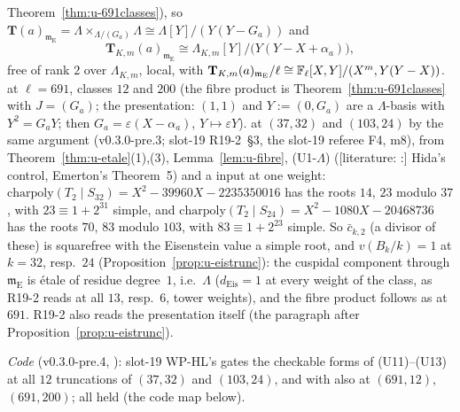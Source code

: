 \documentclass[11pt]{article}
\newcommand{\LIT}[1]{\textsf{[literature: #1]}}   %
\newcommand{\Iw}{\Lambda}                         %
\newcommand{\Tu}{\mathbf{T}}                      %
\newcommand{\Eis}{\mathrm{E}}
\begin{document}
\begin{prediction}
\begin{enumerate}
  Theorem~\ref{thm:u-691classes}), so $\Tu(a)_{\mathfrak m_\Eis}=\Iw\times_{\Iw/(G_a)}\Iw\cong\Iw[Y]/(Y(Y-G_a))$ and
  \[
    \Tu_{K,m}(a)_{\mathfrak m_\Eis}\cong\Iw_{K,m}[Y]/\bigl(Y(Y-X+\alpha_a)\bigr),
  \]
  free of rank $2$ over $\Iw_{K,m}$, local, with $\Tu_{K,m}(a)_{\mathfrak m_\Eis}/\ell\cong\Fl[X,Y]/(X^{m},Y(Y-X))$. \PROVED{} at $\ell=691$, classes $12$ and $200$ (the fibre product
  is Theorem~\ref{thm:u-691classes} with $J=(G_a)$; the presentation: $(1,1)$ and $Y:=(0,G_a)$ are a $\Iw$-basis with $Y^{2}=G_aY$; then
  $G_a=\varepsilon(X-\alpha_a)$, $Y\mapsto\varepsilon Y$). \PROVED{} at $(37,32)$ and $(103,24)$ by the same argument (v0.3.0-pre.3; slot-19 R19-2~\S3, the slot-19
  referee F4, m8), from Theorem~\ref{thm:u-etale}(1),(3), Lemma~\ref{lem:u-fibre}, (U1-$\Iw$) (\LIT: Hida's control, Emerton's Theorem~5) and a \COMP{} input at one
  weight: $\mathrm{charpoly}(T_2\mid S_{32})=X^{2}-39960X-2235350016$ has the roots $14$, $23$ modulo $37$, with $23\equiv1+2^{31}$ simple, and
  $\mathrm{charpoly}(T_2\mid S_{24})=X^{2}-1080X-20468736$ has the roots $70$, $83$ modulo $103$, with $83\equiv1+2^{23}$ simple. So $\bar c_{k,2}$ (a divisor of these) is
  squarefree with the Eisenstein value a simple root, and $v(B_k/k)=1$ at $k=32$, resp.\ $24$ (Proposition~\ref{prop:u-eistrunc}): the cuspidal component through
  $\mathfrak m_\Eis$ is étale of residue degree~$1$, i.e.\ $\Iw$ ($d_{\mathrm{Eis}}=1$ at every weight of the class, as R19-2 reads at all $13$, resp.\ $6$, tower weights),
  and the fibre product follows as at $691$. R19-2 also reads the presentation itself (the paragraph after Proposition~\ref{prop:u-eistrunc}).
\end{enumerate}
\emph{Code} (v0.3.0-pre.4, \COMP): slot-19 WP-HL's  gates the checkable forms of (U11)--(U13) at all $12$ truncations of $(37,32)$ and $(103,24)$, and with
 also at $(691,12)$, $(691,200)$; all held (the code map below).
\end{prediction}
\end{document}
